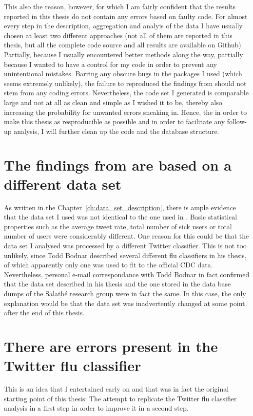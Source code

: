 \documentclass[11pt, a4paper,twoside]{report}\usepackage[]{graphicx}\usepackage[]{color}
\begin{document}
This also the reason, however, for which I am fairly confident that the results reported in this thesis do not contain any errors based on faulty code. For almost every step in the description, aggregation and analyis of the data I have usually chosen at least two different approaches (not all of them are reported in this thesis, but all the complete code source and all results are available on Github) Partially, because I usually encountered better methods along the way, partially because I wanted to have a control for my code in order to prevent any unintentional mistakes. Barring any obscure bugs in the packages I used (which seems extremely unlikely), the failure to reproduced the findings from \citep{bodnar_data_2015} should not stem from any coding errors. Nevertheless, the code set I generated is comparable large and not at all as clean and simple as I wished it to be, thereby also increasing the probability for unwanted errors sneaking in. Hence, the in order to make this thesis as resproducible as possible and in order to facilitate any follow-up analysis, I will further clean up the code and the database structure.\newline

\section{The findings from \citep{bodnar_data_2015} are based on a different data set}
As written in the Chapter~\ref{ch:data_set_description}, there is ample evidence that the data set I used was not identical to the one used in \citep{bodnar_data_2015}. Basic statistical properties such as the average tweet rate, total number of sick users or total number of users were considerably different. One reason for this could be that the data set I analysed was processed by a different Twitter classifier. This is not too unlikely, since Todd Bodnar described several different flu classifiers in his thesis, of which apparently only one was used to fit to the official CDC data. Nevertheless, personal e-mail correspondance with Todd Bodnar in fact confirmed that the data set described in his thesis and the one stored in the data base dumps of the Salathé research group were in fact the same. In this case, the only explanation would be that the data set was inadvertently changed at some point after the end of this thesis.\newline

\section{There are errors present in the Twitter flu classifier}
This is an idea that I entertained early on and that was in fact the original starting point of this thesis: The attempt to replicate the Twitter flu classifier analysis in a first step in order to improve it in a second step.\newline
\end{document}
